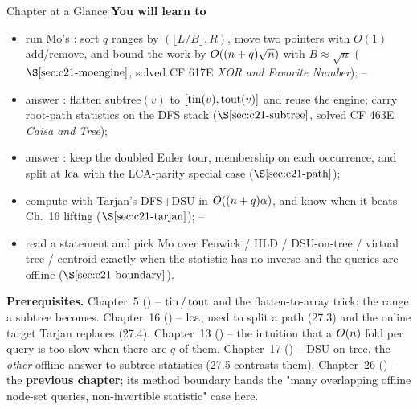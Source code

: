 \begin{chaptertheorybox}{Chapter at a Glance}
\textbf{You will learn to}
\begin{itemize}[nosep]
  \item run Mo's : sort \(q\) ranges by \((\lfloor L/B\rfloor, R)\),
        move two pointers with \(O(1)\) add/remove, and bound the work by
        \(O((n+q)\sqrt n)\) with \(B\approx\sqrt n\)
        (\(\secref{c21-moengine}\), solved CF 617E \emph{XOR and Favorite Number}); \hfill{}--
  \item answer : flatten subtree\((v)\) to \([\operatorname{tin}(v),\operatorname{tout}(v)]\)
        and reuse the engine; carry root-path statistics on the DFS stack
        (\(\secref{c21-subtree}\), solved CF 463E \emph{Caisa and Tree}); \hfill{}
  \item answer : keep the doubled Euler tour, 
        membership on each occurrence, and split at \(\operatorname{lca}\) with the LCA-parity
        special case (\(\secref{c21-path}\)); \hfill{}
  \item compute  with Tarjan's DFS+DSU in \(O((n+q)\alpha)\),
        and know when it beats Ch.~16 lifting (\(\secref{c21-tarjan}\)); \hfill{}--
  \item read a statement and pick Mo over Fenwick / HLD / DSU-on-tree / virtual
        tree / centroid exactly when the statistic has no inverse and the queries
        are offline (\(\secref{c21-boundary}\)). \hfill{}
\end{itemize}

\textbf{Prerequisites.} Chapter~5 () -- \(\operatorname{tin}/\operatorname{tout}\) and the
flatten-to-array trick: the range a subtree becomes.  Chapter~16 () --
\(\operatorname{lca}\), used to split a path (27.3) and the online target Tarjan replaces (27.4).
Chapter~13 () -- the intuition that a \(O(n)\) fold per query is too
slow when there are \(q\) of them.  Chapter~17 () -- DSU on tree, the
\emph{other} offline answer to subtree statistics (27.5 contrasts them).
Chapter~26 () -- the \textbf{previous chapter}; its method boundary hands
the "many overlapping offline node-set queries, non-invertible statistic" case here.
\end{chaptertheorybox}

